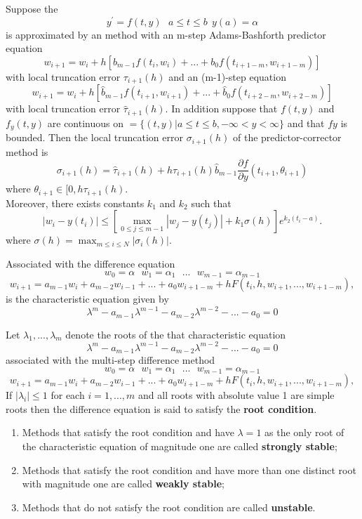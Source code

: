 \begin{theorem}
Suppose the 
\[y^{'}=f(t,y) \ \ \ a\leq t \leq b \ \ y(a)=\alpha  \]
is approximated by an  method with an m-step Adams-Bashforth predictor equation
\[w_{i+1}=w_{i} +h[b_{m-1}f(t_i,w_i)+...+b_0f(t_{i+1-m},w_{i+1-m})] \]
with local truncation error $\tau_{i+1}(h)$ and an (m-1)-step  equation
\[ w_{i+1}=w_{i} +h[\hat{b}_{m-1}f(t_{i+1},w_{i+1})+...+\hat{b}_0f(t_{i+2-m},w_{i+2-m})] \]
with local truncation error $\hat{\tau}_{i+1}(h)$. In addition suppose that $f(t,y)$
and $f_y(t,y)$ are continuous on $=\{(t,y)|a\leq t \leq b, -\infty < y < \infty\}$ and that $fy$ is bounded. Then the local truncation error $\sigma_{i+1}(h)$ 
of the predictor-corrector method is 
\[ \sigma_{i+1}(h)= \hat{\tau}_{i+1}(h)+h\tau_{i+1}(h)\hat{b}_{m-1}\frac{\partial f}{\partial y}(t_{i+1},\theta_{i+1}) \]
where $\theta_{i+1} \in [0,h\tau_{i+1}(h)$.\\
Moreover, there exists constants $k_1$ and $k_2$ such that 
\[|w_i-y(t_i)| \leq \left[\max_{0\leq j \leq m-1}|w_{j}-y(t_j)|+k_1\sigma(h)\right]e^{k_2(t_i-a)}.\]
where $\sigma(h)=\max_{m\leq i \leq N}|\sigma_{i}(h)|$.
\end{theorem}
\begin{definition}
Associated with the difference equation 
\[ w_0=\alpha \ \ \ w_1=\alpha_1 \ \ \ ... \ \ \ w_{m-1}=\alpha_{m-1} \]
\[w_{i+1} = a_{m-1}w_{i}+a_{m-2}w_{i-1}+...+a_{0}w_{i+1-m} +hF(t_i,h,w_{i+1},...,w_{i+1-m}),\]
is the characteristic equation given by
\[\lambda^{m} - a_{m-1}\lambda^{m-1}-a_{m-2}\lambda^{m-2}-...-a_{0} =0 \]
\end{definition}
\begin{definition}
Let $\lambda_1,...,\lambda_m$ denote the roots of the that characteristic equation
\[\lambda^{m} - a_{m-1}\lambda^{m-1}-a_{m-2}\lambda^{m-2}-...-a_{0} =0 \]
associated with the multi-step difference method
\[ w_0=\alpha \ \ \ w_1=\alpha_1 \ \ \ ... \ \ \ w_{m-1}=\alpha_{m-1} \]
\[w_{i+1} = a_{m-1}w_{i}+a_{m-2}w_{i-1}+...+a_{0}w_{i+1-m} +hF(t_i,h,w_{i+1},...,w_{i+1-m}),\]
If $|\lambda_{i}|\leq 1$ for each $i=1,...,m$ and all roots with absolute value 1
are simple roots then the difference equation is said to satisfy the \textbf{root condition}.
\end{definition}
\begin{definition}

\begin{enumerate}
\item
Methods that satisfy the root condition and have $\lambda=1$ as the only root 
of the characteristic equation of magnitude one are called \textbf{strongly stable};
\item
Methods that satisfy the root condition and have more than one distinct root
with magnitude one are called \textbf{weakly stable};
\item
Methods that do not satisfy the root condition are called \textbf{unstable}.
\end{enumerate}
\end{definition}

